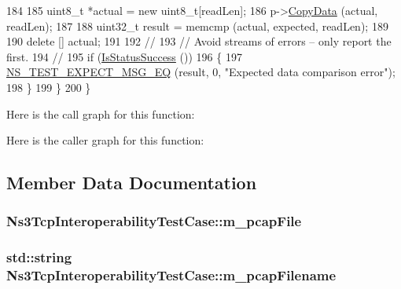 \begin{DoxyCode}
184 
185       uint8\_t *actual = \textcolor{keyword}{new} uint8\_t[readLen];
186       p->\hyperlink{classns3_1_1Packet_a5a6d304b9e0d90733919ffe224b98f0d}{CopyData} (actual, readLen);
187 
188       uint32\_t result = memcmp (actual, expected, readLen);
189 
190       \textcolor{keyword}{delete} [] actual;
191 
192       \textcolor{comment}{//}
193       \textcolor{comment}{// Avoid streams of errors -- only report the first.}
194       \textcolor{comment}{//}
195       \textcolor{keywordflow}{if} (\hyperlink{classns3_1_1TestCase_a76d97c8d3aadccc6231e50d863cde388}{IsStatusSuccess} ())
196         \{
197           \hyperlink{group__testing_ga7304ba46a28d8cf08dfdfd6499cf7068}{NS\_TEST\_EXPECT\_MSG\_EQ} (result, 0, \textcolor{stringliteral}{"Expected data comparison error"});
198         \}
199     \}
200 \}
\end{DoxyCode}


Here is the call graph for this function\+:




Here is the caller graph for this function\+:




\subsection{Member Data Documentation}
\subsubsection[{\texorpdfstring{m\+\_\+pcap\+File}{m_pcapFile}}]{ Ns3\+Tcp\+Interoperability\+Test\+Case\+::m\+\_\+pcap\+File\hspace{0.3cm}{\ttfamily [private]}}\hypertarget{classNs3TcpInteroperabilityTestCase_a0d3ad7f3621d79aa2db483829c3d04fc}{}\label{classNs3TcpInteroperabilityTestCase_a0d3ad7f3621d79aa2db483829c3d04fc}
\subsubsection[{\texorpdfstring{m\+\_\+pcap\+Filename}{m_pcapFilename}}]{\setlength{\rightskip}{0pt plus 5cm}std\+::string Ns3\+Tcp\+Interoperability\+Test\+Case\+::m\+\_\+pcap\+Filename\hspace{0.3cm}{\ttfamily [private]}}\hypertarget{classNs3TcpInteroperabilityTestCase_a207e7f877ef9921efefd3f20d6f58bce}{}\label{classNs3TcpInteroperabilityTestCase_a207e7f877ef9921efefd3f20d6f58bce}
